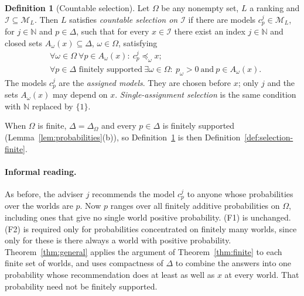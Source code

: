 \documentclass[11pt]{article}
\theoremstyle{definition}
\newtheorem{definition}[theorem]{Definition}
\theoremstyle{remark}
\newcommand{\M}{\mathcal M}
\newcommand{\I}{\mathcal I}
\begin{document}
\begingroup\color{red}
\begin{definition}[Countable selection]\label{def:selection}\label{def:family}
Let $\Omega$ be any nonempty set, $L$ a ranking and $\I\subseteq\M_L$. Then $L$ satisfies \emph{countable selection on $\I$} if there are models $c^j_p\in\M_L$, for $j\in\mathbb N$ and $p\in\Delta$, such that for every $x\in\I$ there exist an index $j\in\mathbb N$ and closed sets $A_\omega(x)\subseteq\Delta$, $\omega\in\Omega$, satisfying
\begin{align}
&\forall\omega\in\Omega\ \forall p\in A_\omega(x):\ c^j_p\preceq_\omega x;\tag{F1}\\
&\forall p\in\Delta\text{ finitely supported}\ \exists\omega\in\Omega:\ p_\omega>0\ \text{and}\ p\in A_\omega(x).\tag{F2}
\end{align}
The models $c^j_p$ are the \emph{assigned models}. They are chosen before $x$; only $j$ and the sets $A_\omega(x)$ may depend on $x$. \emph{Single-assignment selection} is the same condition with $\mathbb N$ replaced by $\{1\}$.
\end{definition}
When $\Omega$ is finite, $\Delta=\Delta_\Omega$ and every $p\in\Delta$ is finitely supported (Lemma~\ref{lem:probabilities}(b)), so Definition~\ref{def:selection} is then Definition~\ref{def:selection-finite}.

\paragraph{Informal reading.} As before, the adviser $j$ recommends the model $c^j_p$ to anyone whose probabilities over the worlds are $p$. Now $p$ ranges over all finitely additive probabilities on $\Omega$, including ones that give no single world positive probability. (F1) is unchanged. (F2) is required only for probabilities concentrated on finitely many worlds, since only for these is there always a world with positive probability. Theorem~\ref{thm:general} applies the argument of Theorem~\ref{thm:finite} to each finite set of worlds, and uses compactness of $\Delta$ to combine the answers into one probability whose recommendation does at least as well as $x$ at every world. That probability need not be finitely supported.
\end{document}
